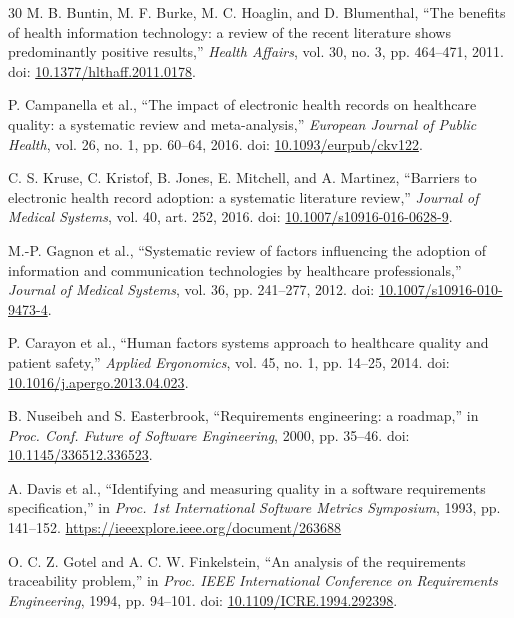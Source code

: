 \documentclass[11pt,a4paper]{article}
\begin{document}
\begin{thebibliography}{30}
		M. B. Buntin, M. F. Burke, M. C. Hoaglin, and D. Blumenthal, ``The benefits of health information technology: a review of the recent literature shows predominantly positive results,'' \emph{Health Affairs}, vol. 30, no. 3, pp. 464--471, 2011. doi: \href{https://doi.org/10.1377/hlthaff.2011.0178}{10.1377/hlthaff.2011.0178}.
		
		P. Campanella et al., ``The impact of electronic health records on healthcare quality: a systematic review and meta-analysis,'' \emph{European Journal of Public Health}, vol. 26, no. 1, pp. 60--64, 2016. doi: \href{https://doi.org/10.1093/eurpub/ckv122}{10.1093/eurpub/ckv122}.
		
		C. S. Kruse, C. Kristof, B. Jones, E. Mitchell, and A. Martinez, ``Barriers to electronic health record adoption: a systematic literature review,'' \emph{Journal of Medical Systems}, vol. 40, art. 252, 2016. doi: \href{https://doi.org/10.1007/s10916-016-0628-9}{10.1007/s10916-016-0628-9}.
		
		M.-P. Gagnon et al., ``Systematic review of factors influencing the adoption of information and communication technologies by healthcare professionals,'' \emph{Journal of Medical Systems}, vol. 36, pp. 241--277, 2012. doi: \href{https://doi.org/10.1007/s10916-010-9473-4}{10.1007/s10916-010-9473-4}.
		
		P. Carayon et al., ``Human factors systems approach to healthcare quality and patient safety,'' \emph{Applied Ergonomics}, vol. 45, no. 1, pp. 14--25, 2014. doi: \href{https://doi.org/10.1016/j.apergo.2013.04.023}{10.1016/j.apergo.2013.04.023}.
		
		B. Nuseibeh and S. Easterbrook, ``Requirements engineering: a roadmap,'' in \emph{Proc. Conf. Future of Software Engineering}, 2000, pp. 35--46. doi: \href{https://doi.org/10.1145/336512.336523}{10.1145/336512.336523}.
		
		A. Davis et al., ``Identifying and measuring quality in a software requirements specification,'' in \emph{Proc. 1st International Software Metrics Symposium}, 1993, pp. 141--152. \url{https://ieeexplore.ieee.org/document/263688}
		
		O. C. Z. Gotel and A. C. W. Finkelstein, ``An analysis of the requirements traceability problem,'' in \emph{Proc. IEEE International Conference on Requirements Engineering}, 1994, pp. 94--101. doi: \href{https://doi.org/10.1109/ICRE.1994.292398}{10.1109/ICRE.1994.292398}.
		

\end{thebibliography}
\end{document}

